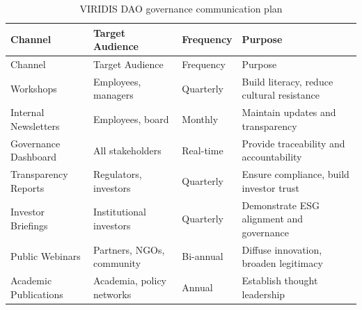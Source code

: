 \documentclass[
  english,
  12pt,
  oneside,
  open=any]{scrbook}
\begin{document}
\begin{longtable}[]{@{}
  >{\raggedright\arraybackslash}p{}
  >{\raggedright\arraybackslash}p{}
  >{\raggedright\arraybackslash}p{}
  >{\raggedright\arraybackslash}p{}@{}}
\caption{VIRIDIS DAO governance communication
plan}\label{tbl-communication}\tabularnewline
\toprule\noalign{}
\begin{minipage}[b]{\linewidth}\raggedright
Channel
\end{minipage} & \begin{minipage}[b]{\linewidth}\raggedright
Target Audience
\end{minipage} & \begin{minipage}[b]{\linewidth}\raggedright
Frequency
\end{minipage} & \begin{minipage}[b]{\linewidth}\raggedright
Purpose
\end{minipage} \\
\midrule\noalign{}
\endfirsthead
\toprule\noalign{}
\begin{minipage}[b]{\linewidth}\raggedright
Channel
\end{minipage} & \begin{minipage}[b]{\linewidth}\raggedright
Target Audience
\end{minipage} & \begin{minipage}[b]{\linewidth}\raggedright
Frequency
\end{minipage} & \begin{minipage}[b]{\linewidth}\raggedright
Purpose
\end{minipage} \\
\midrule\noalign{}
\endhead
\bottomrule\noalign{}
\endlastfoot
Workshops & Employees, managers & Quarterly & Build literacy, reduce
cultural resistance \\
Internal Newsletters & Employees, board & Monthly & Maintain updates and
transparency \\
Governance Dashboard & All stakeholders & Real-time & Provide
traceability and accountability \\
Transparency Reports & Regulators, investors & Quarterly & Ensure
compliance, build investor trust \\
Investor Briefings & Institutional investors & Quarterly & Demonstrate
ESG alignment and governance \\
Public Webinars & Partners, NGOs, community & Bi-annual & Diffuse
innovation, broaden legitimacy \\
Academic Publications & Academia, policy networks & Annual & Establish
thought leadership \\
\end{longtable}
\end{document}
